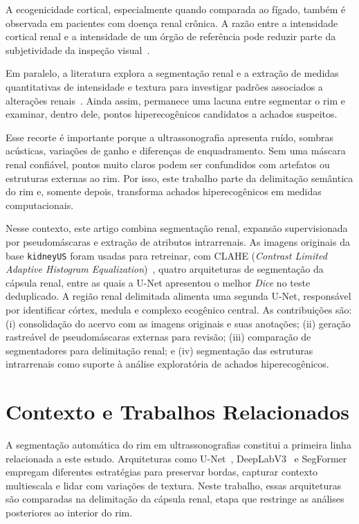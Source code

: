 \documentclass[12pt]{article}
\begin{document}
A ecogenicidade cortical, especialmente quando comparada ao fígado, também é observada em pacientes com doença renal crônica. A razão entre a intensidade cortical renal e a intensidade de um órgão de referência pode reduzir parte da subjetividade da inspeção visual~\cite{Manley2001}.

Em paralelo, a literatura explora a segmentação renal e a extração de medidas quantitativas de intensidade e textura para investigar padrões associados a alterações renais~\cite{Chavhan2008}. Ainda assim, permanece uma lacuna entre segmentar o rim e examinar, dentro dele, pontos hiperecogênicos candidatos a achados suspeitos.

Esse recorte é importante porque a ultrassonografia apresenta ruído, sombras acústicas, variações de ganho e diferenças de enquadramento. Sem uma máscara renal confiável, pontos muito claros podem ser confundidos com artefatos ou estruturas externas ao rim. Por isso, este trabalho parte da delimitação semântica do rim e, somente depois, transforma achados hiperecogênicos em medidas computacionais.

Nesse contexto, este artigo combina segmentação renal, expansão supervisionada por pseudomáscaras e extração de atributos intrarrenais. As imagens originais da base \texttt{kidneyUS} foram usadas para retreinar, com CLAHE (\textit{Contrast Limited Adaptive Histogram Equalization})~\cite{Zuiderveld1994CLAHE}, quatro arquiteturas de segmentação da cápsula renal, entre as quais a U-Net apresentou o melhor \textit{Dice} no teste deduplicado. A região renal delimitada alimenta uma segunda U-Net, responsável por identificar córtex, medula e complexo ecogênico central. As contribuições são: (i) consolidação do acervo com as imagens originais e suas anotações; (ii) geração rastreável de pseudomáscaras externas para revisão; (iii) comparação de segmentadores para delimitação renal; e (iv) segmentação das estruturas intrarrenais como suporte à análise exploratória de achados hiperecogênicos.

\section{Contexto e Trabalhos Relacionados}

A segmentação automática do rim em ultrassonografias constitui a primeira linha relacionada a este estudo. Arquiteturas como U-Net~\cite{Ronneberger2015}, DeepLabV3~\cite{Chen2018DeepLab} e SegFormer~\cite{Xie2021SegFormer} empregam diferentes estratégias para preservar bordas, capturar contexto multiescala e lidar com variações de textura. Neste trabalho, essas arquiteturas são comparadas na delimitação da cápsula renal, etapa que restringe as análises posteriores ao interior do rim.
\end{document}
